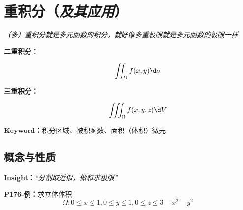 \setcounter{chapter}{10}

\chapter{重积分（{\it 及其应用}）}

{\it （多）重积分就是多元函数的积分，就好像多重极限就是多元函数的极限一样}

\begin{description}
	\item[{\bf 二重积分：}] 
		$$\iint_Df(x,y)\d\sigma$$ 
	\item[{\bf 三重积分：}] 
		$$\iiint_{\Omega}f(x,y,z)\d V$$ 
\end{description}

{\bf Keyword：}积分区域、被积函数、面积（体积）微元

\section{概念与性质}

{\bf Insight：}{\it “分割取近似，做和求极限”}

{\bf P176-例：}求立体体积
$$\Omega:0\leq x\leq 1,0\leq y\leq 1,0\leq z\leq 3-x^2-y^2$$

